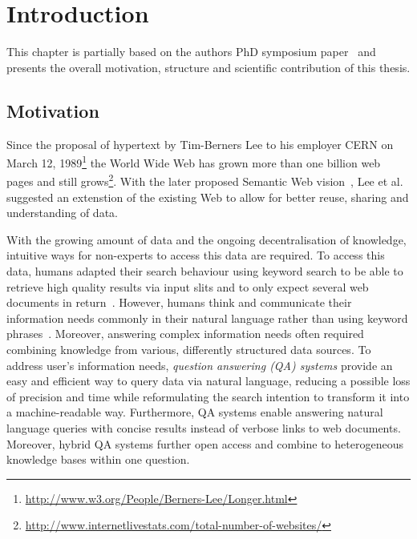 \chapter{Introduction}
This chapter is partially based on the authors PhD symposium paper~\cite{combiningLDandIR} and presents the overall motivation, structure and scientific contribution of this thesis.
\section{Motivation}
Since the proposal of hypertext by Tim-Berners Lee to his employer CERN on March 12, 1989\footnote{\url{http://www.w3.org/People/Berners-Lee/Longer.html}} the World Wide Web has grown more than one billion web pages and still grows\footnote{\url{http://www.internetlivestats.com/total-number-of-websites/}}.
With the later proposed Semantic Web vision~\cite{bernerslee2001semantic}, Lee et al. suggested an extenstion of the existing Web to allow for better reuse, sharing and understanding of data. %

With the growing amount of data and the ongoing decentralisation of knowledge, intuitive ways for non-experts to access this data are required. 
To access this data, humans adapted their search behaviour using keyword search to be able to retrieve high quality results via input slits and to only expect several web documents in return~\cite{ilprints361}.
However, humans think and communicate their information needs commonly in their natural language rather than using keyword phrases~\cite{woods1973progress}. 
Moreover, answering complex information needs often required combining knowledge from various, differently structured data sources.
To address user's information needs, \emph{question answering (QA) systems} provide an easy and efficient way to query data via natural language, reducing a possible loss of precision and time while reformulating the search intention to transform it into a machine-readable way.
Furthermore, QA systems enable answering natural language queries with concise results instead of verbose links to web documents. 
Moreover, hybrid QA systems further open access and combine to heterogeneous knowledge bases within one question.

